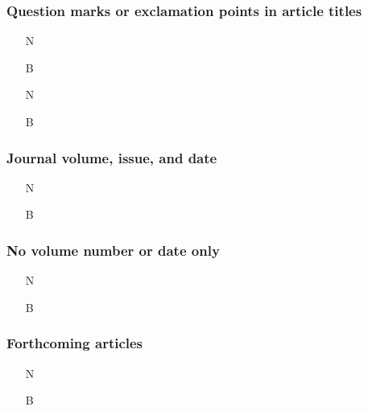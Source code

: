 \documentclass[11pt,letterpaper,oneside]{article}
\begin{document}
\setcounter{subsubsection}{177}
\subsubsection{Question marks or exclamation points in article titles}

\begin{itemize}
\item[N] 

\item[B] 

\item[N] 

\item[B] 
\end{itemize}

\setcounter{subsubsection}{179}
\subsubsection{Journal volume, issue, and date}

\begin{itemize}
\item[N] 

\item[B] 
\end{itemize}

\setcounter{subsubsection}{180}
\subsubsection{No volume number or date only}

\begin{itemize}
\item[N] 

\item[B] 
\end{itemize}

\subsubsection{Forthcoming articles}

\begin{itemize}
\item[N] 

\item[B] 
\end{itemize}
\end{document}
